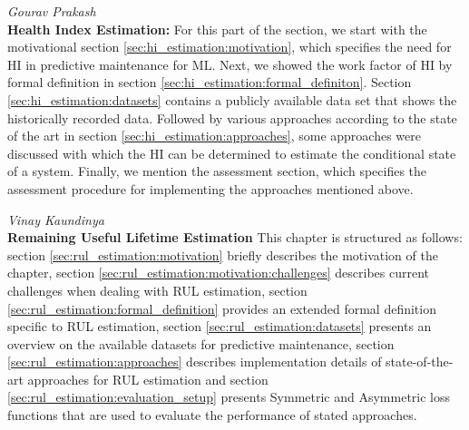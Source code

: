 \hfill{\normalsize\emph{Gourav Prakash}} \\
\textbf{Health Index Estimation:} For this part of the section, we start with the motivational section \ref{sec:hi_estimation:motivation}, which specifies the need for HI in predictive maintenance for ML. Next, we showed the work factor of HI by formal definition in section \ref{sec:hi_estimation:formal_definiton}. Section \ref{sec:hi_estimation:datasets} contains a publicly available data set that shows the historically recorded data. Followed by various approaches according to the state of the art in section \ref{sec:hi_estimation:approaches}, some approaches were discussed with which the HI can be determined to estimate the conditional state of a system. Finally, we mention the assessment section, which specifies the assessment procedure for implementing the approaches mentioned above.

\hfill{\normalsize\emph{Vinay Kaundinya}} \\
\textbf{Remaining Useful Lifetime Estimation} This chapter is structured as follows: section \ref{sec:rul_estimation:motivation} briefly describes the motivation of the chapter, section \ref{sec:rul_estimation:motivation:challenges} describes current challenges when dealing with RUL estimation, section \ref{sec:rul_estimation:formal_definition} provides an extended formal definition specific to RUL estimation, section \ref{sec:rul_estimation:datasets} presents an overview on the available datasets for predictive maintenance, section \ref{sec:rul_estimation:approaches} describes implementation details of state-of-the-art approaches for RUL estimation and section \ref{sec:rul_estimation:evaluation_setup} presents Symmetric and Asymmetric loss functions that are used to evaluate the performance of stated approaches.